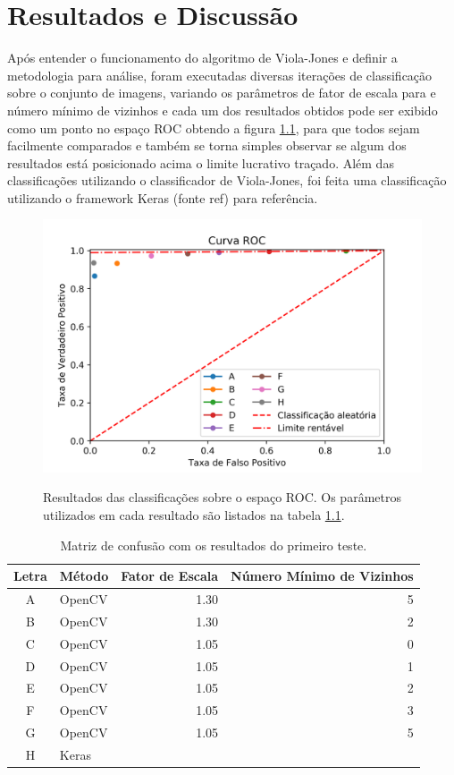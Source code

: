 \chapter{Resultados e Discussão}\label{cap:resultados}

Após entender o funcionamento do algoritmo de Viola-Jones e definir a metodologia para análise, foram executadas diversas iterações de classificação sobre o conjunto de imagens, variando os parâmetros de fator de escala para e número mínimo de vizinhos e cada um dos resultados obtidos pode ser exibido como um ponto no espaço ROC obtendo a figura \ref{fig:results_roc}, para que todos sejam facilmente comparados e também se torna simples observar se algum dos resultados está posicionado acima o limite lucrativo traçado. Além das classificações utilizando o classificador de Viola-Jones, foi feita uma classificação utilizando o framework Keras (fonte ref{}) para referência. 

\begin{figure}[htbp]
     \centering
     \caption{Resultados das classificações sobre o espaço ROC. Os parâmetros utilizados em cada resultado são listados na tabela \ref{tab:results_identify}.}
     \includegraphics[scale=1]{figs/curva_roc_results.png}
     \label{fig:results_roc}
 \end{figure}

 \begin{table}[htbp]
     \caption{Matriz de confusão com os resultados do primeiro teste.}
     \label{tab:results_identify}
     \centering
     \begin{tabular}{clrr}
      Letra & Método & Fator de Escala & Número Mínimo de Vizinhos \\
      \midrule
           A & OpenCV & 1.30 & 5 \\
           B & OpenCV & 1.30 & 2 \\
           C & OpenCV & 1.05 & 0 \\
           D & OpenCV & 1.05 & 1 \\
           E & OpenCV & 1.05 & 2 \\
           F & OpenCV & 1.05 & 3 \\
           G & OpenCV & 1.05 & 5 \\
           H & Keras & & \\
      \end{tabular}
 \end{table}


